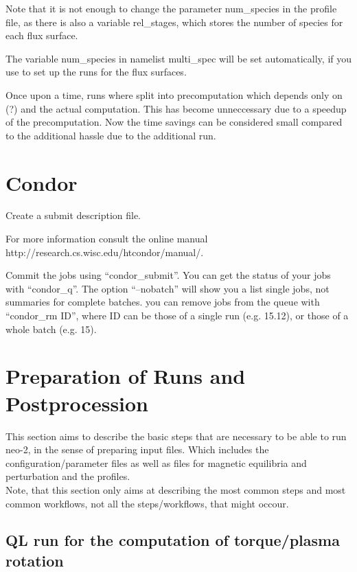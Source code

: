 Note that it is not enough to change the parameter num\_species in the
profile file, as there is also a variable rel\_stages, which stores the
number of species for each flux surface.

The variable num\_species in namelist multi\_spec will be set
automatically, if you use \neotwo to set up the runs for the flux
surfaces.

Once upon a time, runs where split into precomputation which depends
only on (?) and the actual computation. This has become unneccessary due
to a speedup of the precomputation. Now the time savings can be
considered small compared to the additional hassle due to the additional
run.

\section{Condor}

Create a submit description file.

For more information consult the online manual http://research.cs.wisc.edu/htcondor/manual/.

Commit the jobs using ``condor\_submit''.
You can get the status of your jobs with ``condor\_q''. The option
``--nobatch'' will show you a list single jobs, not summaries for
complete batches.
you can remove jobs from the queue with ``condor\_rm ID'', where ID can
be those of a single run (e.g. 15.12), or those of a whole batch (e.g.
15).

\section{Preparation of Runs and Postprocession}
This section aims to describe the basic steps that are necessary to be
able to run neo-2, in the sense of preparing input files. Which includes
the configuration/parameter files as well as files for magnetic
equilibria and perturbation and the profiles.\\
Note, that this section only aims at describing the most common steps
and most common workflows, not all the steps/workflows, that might
occour.

\subsection{QL run for the computation of torque/plasma rotation}

